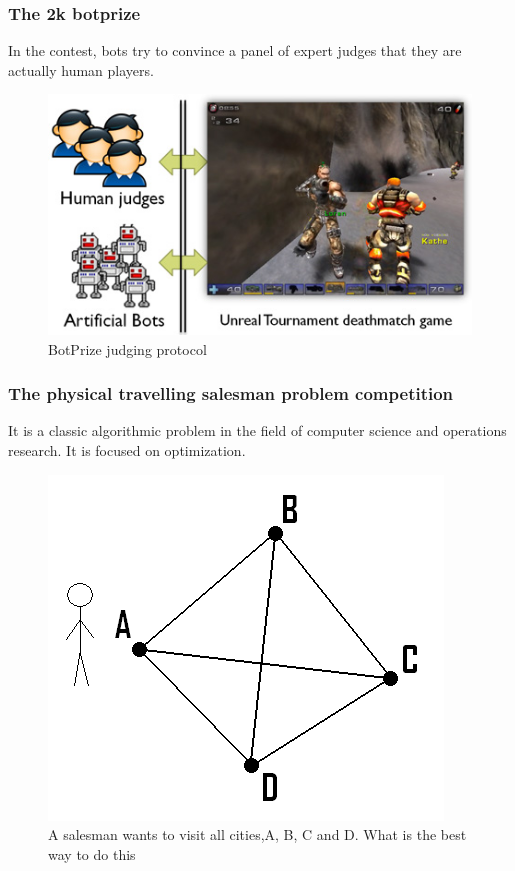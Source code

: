 \documentclass{beamer}
\begin{document}
\begin{frame}
  \frametitle{The 2k botprize\cite{3}}
  In the contest, bots try to convince a panel of expert judges that they are actually human players.
  \begin{figure}
    \includegraphics[width=1\linewidth]{figures/botprize}
    \caption{BotPrize judging protocol}
  \end{figure}

\end{frame}

\begin{frame}
  \frametitle{The physical travelling salesman problem competition\cite{4}}
  It is a classic algorithmic problem in the field of computer science and operations research. It is focused on optimization.
  \begin{figure}
    \includegraphics[width=0.6\linewidth]{figures/salesman}
    \caption{A salesman wants to visit all cities,A, B, C and D. What is the best way to do this}
  \end{figure}
\end{frame}
\end{document}
